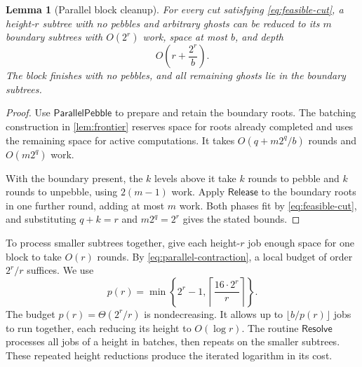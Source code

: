 \documentclass[11pt]{article}
\newtheorem{lemma}[lemma]{Lemma}
\theoremstyle{definition}
\theoremstyle{remark}
\newcommand{\Release}{\mathsf{Release}}
\newcommand{\Sweep}{\mathsf{ParallelPebble}}
\newcommand{\Resolve}{\mathsf{Resolve}}
\begin{document}
\begin{lemma}[Parallel block cleanup]
\label{cor:parallel-contraction}
For every cut satisfying \cref{eq:feasible-cut}, a height-$r$ subtree with no pebbles and arbitrary ghosts can be reduced to its $m$ boundary subtrees with $O(2^r)$ work, space at most $b$, and depth
\begin{equation}
O\!\left(r+\frac{2^r}{b}\right).
\label{eq:parallel-contraction}
\end{equation}
The block finishes with no pebbles, and all remaining ghosts lie in the boundary subtrees.
\end{lemma}
\begin{proof}
Use $\Sweep$ to prepare and retain the boundary roots. The batching construction in \cref{lem:frontier} reserves space for roots already completed and uses the remaining space for active computations. It takes $O(q+m2^q/b)$ rounds and $O(m2^q)$ work.

With the boundary present, the $k$ levels above it take $k$ rounds to pebble and $k$ rounds to unpebble, using $2(m-1)$ work. Apply $\Release$ to the boundary roots in one further round, adding at most $m$ work. Both phases fit by \cref{eq:feasible-cut}, and substituting $q+k=r$ and $m2^q=2^r$ gives the stated bounds.
\end{proof}

To process smaller subtrees together, give each height-$r$ job enough space for one block to take $O(r)$ rounds. By \cref{eq:parallel-contraction}, a local budget of order $2^r/r$ suffices. We use
\begin{equation}
p(r)=\min\left\{2^r-1,\left\lceil\frac{16\cdot2^r}{r}\right\rceil\right\}.
\label{eq:resolver-space}
\end{equation}
The budget $p(r)=\Theta(2^r/r)$ is nondecreasing. It allows up to $\lfloor b/p(r)\rfloor$ jobs to run together, each reducing its height to $O(\log r)$. The routine $\Resolve$ processes all jobs of a height in batches, then repeats on the smaller subtrees. These repeated height reductions produce the iterated logarithm in its cost.
\end{document}
